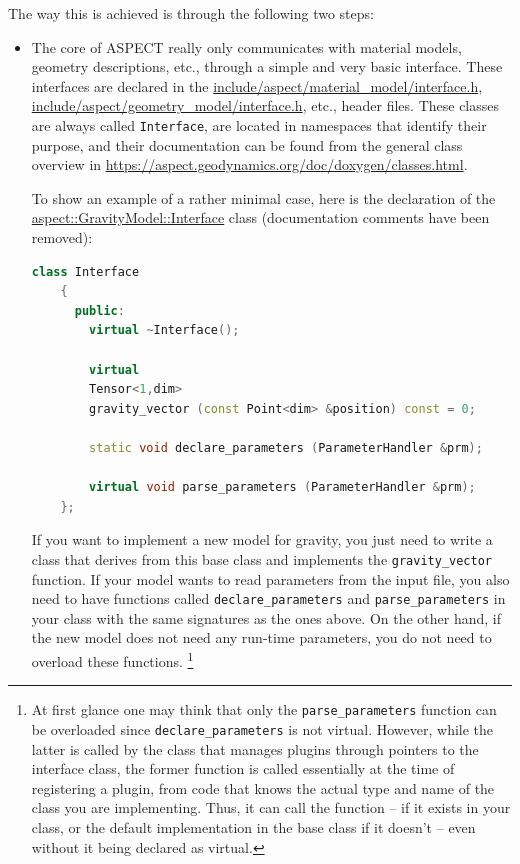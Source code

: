 \documentclass{article}
\newcommand{\aspect}{\textsc{ASPECT}}
\begin{document}
The way this is achieved is through the
following two steps:
\begin{itemize}
\item The core of \aspect{} really only communicates with material models,
  geometry descriptions, etc., through a simple and very basic
  interface. These interfaces are declared in the
  \url{include/aspect/material_model/interface.h},
  \url{include/aspect/geometry_model/interface.h}, etc., header files. These
  classes are always called \texttt{Interface}, are located in namespaces that
  identify their purpose, and their documentation can be found from the
  general class overview in \url{https://aspect.geodynamics.org/doc/doxygen/classes.html}.

  To show an example of a rather minimal case, here is the declaration of the
\href{https://aspect.geodynamics.org/doc/doxygen/classaspect_1_1GravityModel_1_1Interface.html}{aspect::GravityModel::Interface} class (documentation comments have
  been removed):
  \begin{lstlisting}[frame=single,language=C++]
    class Interface
    {
      public:
        virtual ~Interface();

        virtual
        Tensor<1,dim>
        gravity_vector (const Point<dim> &position) const = 0;

        static void declare_parameters (ParameterHandler &prm);

        virtual void parse_parameters (ParameterHandler &prm);
    };
  \end{lstlisting}

  If you want to implement a new model for gravity, you just need to write a
  class that derives from this base class and implements the
  \texttt{gravity\_vector} function. If your model wants to read parameters
  from the input file, you also need to have functions called
  \texttt{declare\_parameters} and \texttt{parse\_parameters} in your class
  with the same signatures as the ones above. On the other hand, if the new
  model does not need any run-time parameters, you do not need to overload
  these functions.%
  \footnote{At first glance one may think that only the
    \texttt{parse\_parameters} function can be overloaded since
    \texttt{declare\_parameters} is not virtual. However, while the latter is
    called by the class that manages plugins through pointers to the interface
    class, the former function is called essentially at the time of
    registering a plugin, from code that knows the actual type and name of the
    class you are implementing. Thus, it can call the function -- if it exists
    in your class, or the default implementation in the base class if it doesn't
    -- even without it being declared as virtual.}


\end{itemize}
\end{document}
